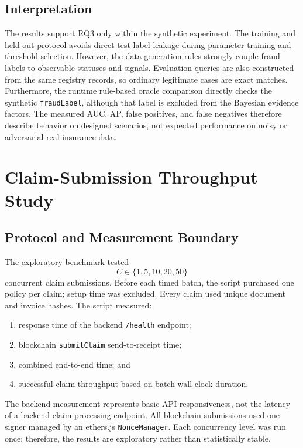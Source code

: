 \subsection{Interpretation}

The results support RQ3 only within the synthetic experiment. The training and
held-out protocol avoids direct test-label leakage during parameter training and
threshold selection. However, the data-generation rules strongly couple fraud
labels to observable statuses and signals. Evaluation queries are also
constructed from the same registry records, so ordinary legitimate cases are
exact matches. Furthermore, the runtime rule-based oracle comparison directly
checks the synthetic \texttt{fraudLabel}, although that label is excluded from
the Bayesian evidence factors. The measured AUC, AP, false positives, and false
negatives therefore describe behavior on designed scenarios, not expected
performance on noisy or adversarial real insurance data.

\section{Claim-Submission Throughput Study}
\label{sec:throughput_results}

\subsection{Protocol and Measurement Boundary}

The exploratory benchmark tested
\begin{equation}
C\in\{1,5,10,20,50\}
\end{equation}
concurrent claim submissions. Before each timed batch, the script purchased one
policy per claim; setup time was excluded. Every claim used unique document and
invoice hashes. The script measured:
\begin{enumerate}
    \item response time of the backend \texttt{/health} endpoint;
    \item blockchain \texttt{submitClaim} send-to-receipt time;
    \item combined end-to-end time; and
    \item successful-claim throughput based on batch wall-clock duration.
\end{enumerate}

The backend measurement represents basic API responsiveness, not the latency of
a backend claim-processing endpoint. All blockchain submissions used one signer
managed by an ethers.js \texttt{NonceManager}. Each concurrency level was run
once; therefore, the results are exploratory rather than statistically stable.

